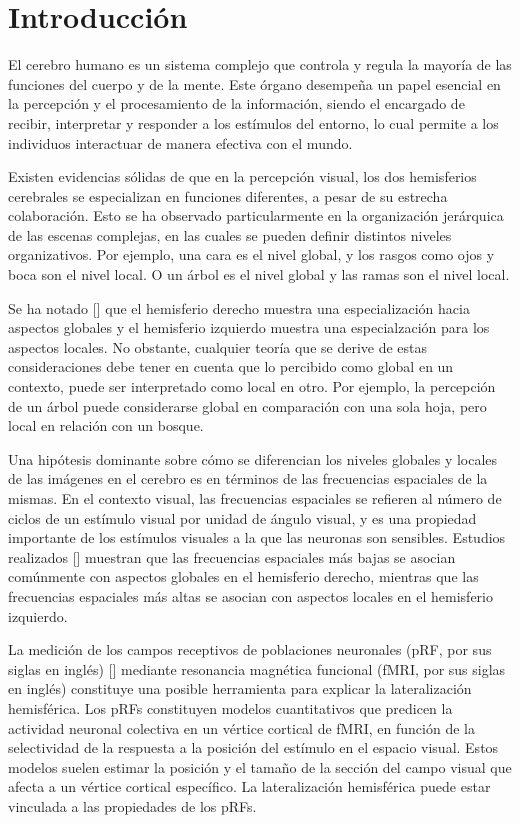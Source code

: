 \chapter*{Introducción}\label{chapter:introduction}

El cerebro humano es un sistema complejo que controla y regula la mayoría de las funciones del cuerpo y de la mente. Este órgano desempeña un papel esencial en la percepción y el procesamiento de la información, siendo el encargado de recibir, interpretar y responder a los estímulos del entorno, lo cual permite a los individuos interactuar de manera efectiva con el mundo. 

Existen evidencias s\'olidas de que en la percepción visual, los dos hemisferios cerebrales se especializan en funciones diferentes, a pesar de su estrecha colaboraci\'on. Esto se ha observado particularmente en la organizaci\'on jer\'arquica de las escenas complejas, en las cuales se pueden definir distintos niveles organizativos.  Por ejemplo, una cara es el nivel global, y los rasgos como ojos y boca son el nivel local. O un \'arbol es el nivel global y las ramas son el nivel local.

 Se ha notado [\cite{flevaris_spatial_2016}] que el hemisferio derecho muestra una especializaci\'on hacia aspectos globales  y el hemisferio izquierdo muestra una especialzaci\'on para los aspectos locales. No obstante, cualquier teoría que se derive de estas consideraciones debe tener en cuenta que lo percibido como global en un contexto, puede ser interpretado  como local en otro. Por ejemplo, la percepción de un árbol puede considerarse global en comparación con una sola hoja, pero local en relación con un bosque.

Una hipótesis dominante sobre cómo se diferencian los niveles globales y locales de las im\'agenes en el  cerebro es en términos de las frecuencias espaciales de la mismas. En el contexto visual, las frecuencias espaciales se refieren al número de ciclos de un estímulo visual por unidad de ángulo visual, y es una propiedad importante de los estímulos visuales a la que las neuronas son sensibles. Estudios realizados [\cite{flevaris_spatial_2016}] muestran que las frecuencias espaciales más bajas se asocian comúnmente con aspectos globales en el hemisferio derecho, mientras que las frecuencias espaciales más altas se asocian con aspectos locales en el hemisferio izquierdo. 


La medición de los campos receptivos de poblaciones neuronales (pRF, por sus siglas en ingl\'es) [\cite{dumoulin_population_2008}] mediante resonancia magnética funcional (fMRI, por sus siglas en ingl\'es) constituye una posible herramienta para explicar la lateralización hemisférica. Los pRFs constituyen modelos cuantitativos que predicen la actividad neuronal colectiva en un v\'ertice cortical de fMRI, en función de la selectividad de la respuesta a la posición del estímulo en el espacio visual. Estos modelos suelen estimar la posición y el tamaño de la sección del campo visual que afecta a un v\'ertice cortical específico. La lateralización hemisférica puede estar vinculada a las propiedades de los pRFs.

